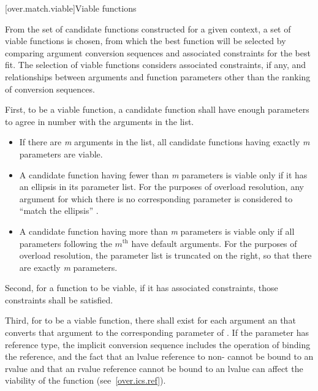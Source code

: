 %

[over.match.viable]{Viable functions}%

\pnum
From the set of candidate functions constructed for a given
context, a set of viable functions is
chosen, from which the best function will be selected by
comparing argument conversion sequences
and associated constraints
for the best fit.
The selection of viable functions considers
associated constraints, if any, and
relationships between arguments and function parameters other
than the ranking of conversion sequences.

\pnum
{}%
%
First, to be a viable function, a candidate function shall have
enough parameters to agree in number with the arguments in the
list.

\begin{itemize}
\item
If there are
\textit{m}
arguments in the list, all candidate
functions having exactly
\textit{m}
parameters are viable.
\item
A candidate function having fewer than
\textit{m}
parameters is
viable only if it has an ellipsis in its parameter list.
For the purposes of overload resolution,
any argument for which there is no corresponding parameter is
considered to ``match the ellipsis'' .
\item
A candidate function having more than
\textit{m}
parameters is viable
only if all parameters following the $m^\text{th}$
have default arguments.
For the purposes of overload
resolution, the parameter list is truncated on the right, so
that there are exactly
\textit{m}
parameters.
\end{itemize}

\pnum
Second, for a function to be viable, if it has associated constraints,
those constraints shall be satisfied.

\pnum
Third, for
to be a viable function, there shall exist for each
argument an
 that
converts that argument to the corresponding parameter of
.
If the parameter has reference type, the implicit conversion sequence
includes the operation of binding the reference, and the fact that
an lvalue reference to non- cannot be bound to an rvalue
and that an rvalue reference cannot be bound to an lvalue
can affect
the viability of the function (see~\ref{over.ics.ref}).

